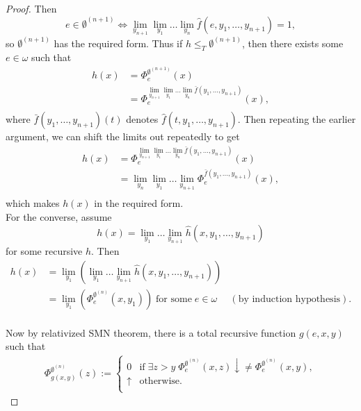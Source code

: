 \documentclass{article}
\begin{document}
\begin{enumerate}[label={\bf Q\arabic*:}]
\begin{proof}
      Then
      \[e\in\emptyset^{(n+1)} \Leftrightarrow
      \lim_{y_{n+1}}\lim_{y_1}\ldots\lim_{y_n}
      \hat{f}(e,y_1,\ldots,y_{n+1}) =1,\]
      so $\emptyset^{(n+1)}$ has the required form. Thus if
      $h\leq_T\emptyset^{(n+1)}$, then there exists some $e\in\omega$ such
      that
      \begin{align*}
        h(x) &=\Phi_e^{\emptyset^{(n+1)}}(x)\\
        &=\Phi_e^{\lim_{y_{n+1}}\lim_{y_1}\ldots\lim_{y_n}
          \bar{f}(y_1,\ldots,y_{n+1})}(x),\\
      \end{align*}
      where $\bar{f}(y_1,\ldots,y_{n+1})(t)$ denotes
      $\hat{f}(t,y_1,\ldots,y_{n+1})$. Then repeating the earlier argument,
      we can shift the limits out repeatedly to get
      \begin{align*}
        h(x) &=\Phi_e^{\lim_{y_{n+1}}\lim_{y_1}\ldots\lim_{y_n}
          \bar{f}(y_1,\ldots,y_{n+1})}(x)\\
        &=\lim_{y_{n}}\lim_{y_1}\ldots\lim_{y_{n+1}}
          \Phi_e^{\bar{f}(y_1,\ldots,y_{n+1})}(x),\\
      \end{align*}
      which makes $h(x)$ in the required form. \\

      For the converse, assume
      \[h(x) =\lim_{y_{1}}\ldots\lim_{y_{n+1}}
      \hat{h}(x,y_1,\ldots,y_{n+1})\]
      for some recursive $\hat{h}$. Then
      \begin{align*}
        h(x) &=\lim_{y_1} \left(\lim_{y_{1}}\ldots\lim_{y_{n+1}}
          \hat{h}(x,y_1,\ldots,y_{n+1}) \right)\\
        &=\lim_{y_1} \left(\Phi_e^{\emptyset^{(n)}}(x,y_1) \right)\;
          \text{for some}\; e\in\omega &(\text{by induction
          hypothesis}).\\
      \end{align*}

      Now by relativized SMN theorem, there is a total recursive function
      $g(e,x,y)$ such that
      \begin{align*}
        \Phi^{\emptyset^{(n)}}_{g(x,y)}(z) :=
        \begin{cases}
          0 &\text{if}\; \exists z>y\;
            \Phi_e^{\emptyset^{(n)}}(x,z)\downarrow\neq
            \Phi_e^{\emptyset^{(n)}}(x,y),\\
          \uparrow &\text{otherwise}.\\
        \end{cases}
      \end{align*}


\end{proof}
\end{enumerate}
\end{document}
